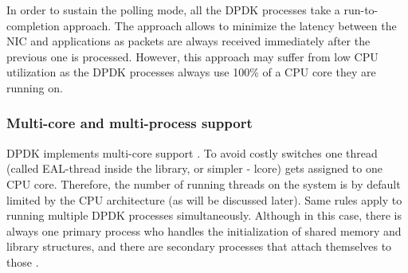 \documentclass[english]{kththesis}
\begin{document}
In order to sustain the polling mode, all the \gls{DPDK} processes take a run-to-completion approach. The approach allows to minimize the latency between the \gls{NIC} and applications as packets are always received immediately after the previous one is processed. However, this approach may suffer from low CPU utilization as the DPDK processes always use 100\% of a CPU core they are running on.

\subsubsection{Multi-core and multi-process support}
\gls{DPDK} implements multi-core support \cite{eal}. To avoid costly switches one thread (called \gls{EAL}-thread inside the library, or simpler - lcore) gets assigned to one CPU core. Therefore, the number of running threads on the system is by default limited by the CPU architecture (as will be discussed later). Same rules apply to running multiple DPDK processes simultaneously. Although in this case, there is always one primary process who handles the initialization of shared memory and library structures, and there are secondary processes that attach themselves to those \cite{multi_process}.
\end{document}
